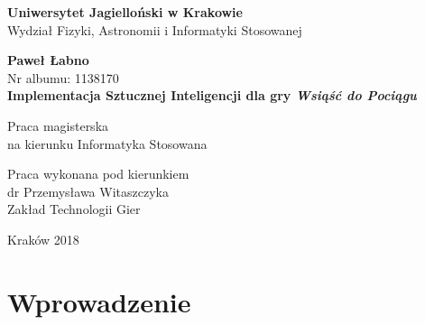 \documentclass[12pt, oneside]{report}
\begin{document}
  
	\setcounter{tocdepth}{1} %
	\thispagestyle{empty}
	\begin{titlepage}
		\begin{center}
			
			\Large
			\textbf{Uniwersytet Jagielloński w Krakowie}\vspace{0.2cm}\\ Wydział Fizyki, Astronomii i Informatyki Stosowanej
			\vspace*{1cm}
			
			\vspace{3cm}
			\Large
			\textbf{Paweł Łabno}\\\vspace{0.5cm}
			\normalsize Nr albumu: 1138170\\
			\vspace{2cm}
			\Huge
			\textbf{Implementacja Sztucznej Inteligencji dla gry \textit{Wsiąść do Pociągu}}
			
			\vspace{1.5cm}
			\normalsize
			Praca magisterska\\
			na kierunku Informatyka Stosowana\\ \vspace{0.15cm}
			
			\vfill
			\vspace{2cm}
			\begin{minipage}{1\textwidth}
				\begin{flushright}
					Praca wykonana pod kierunkiem\\
					dr Przemysława Witaszczyka\\
					Zakład Technologii Gier
				\end{flushright}
			\end{minipage}
			
			\vspace{2cm}
			\begin{center}
				Kraków 2018
			\end{center}
		\end{center}
	\end{titlepage}
	
	\newpage 
	\tableofcontents
	\newpage
	
	\chapter{Wprowadzenie}
\end{document}
